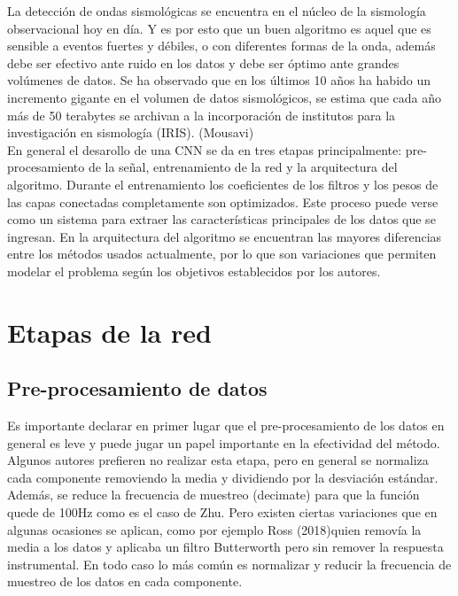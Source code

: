 \documentclass[../main.tex]{subfiles}
\begin{document}
La detección de ondas sismológicas se encuentra en el núcleo de la sismología observacional hoy en día. Y es por esto que un buen algoritmo es aquel que es sensible a eventos fuertes y débiles, o con diferentes formas de la onda, además debe ser efectivo ante ruido en los datos y debe ser óptimo ante grandes volúmenes de datos. Se ha observado que en los últimos 10 años ha habido un incremento gigante en el volumen de datos sismológicos, se estima que cada año más de 50 terabytes se archivan a la incorporación de institutos para la investigación en sismología (IRIS). (Mousavi)\\

En general el desarollo de una CNN se da en tres etapas principalmente: pre-procesamiento de la señal, entrenamiento de la red y la arquitectura del algoritmo. Durante el entrenamiento los coeficientes de los filtros y los pesos de las capas conectadas completamente son optimizados. Este proceso puede verse como un sistema para extraer las características principales de los datos que se ingresan. En la arquitectura del algoritmo se encuentran las mayores diferencias entre los métodos usados actualmente, por lo que son variaciones que permiten modelar el problema según los objetivos establecidos por los autores.\\

\section{Etapas de la red}
\subsection{Pre-procesamiento de datos}

Es importante declarar en primer lugar que el pre-procesamiento de los datos en general es leve y puede jugar un papel importante en la efectividad del método. Algunos autores prefieren no realizar esta etapa, pero en general se normaliza cada componente removiendo la media y dividiendo por la desviación estándar. Además, se reduce la frecuencia de muestreo (decimate) para que la función quede de 100Hz como es el caso de Zhu. Pero existen ciertas variaciones que en algunas ocasiones se aplican, como por ejemplo Ross (2018)quien removía la media a los datos y aplicaba un filtro Butterworth pero sin remover la respuesta instrumental. En todo caso lo más común es normalizar y reducir la frecuencia de muestreo de los datos en cada componente.\\
\end{document}
